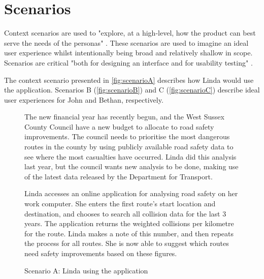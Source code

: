 \documentclass[authoryearcitations]{UoYCSproject}
\begin{document}
\section{Scenarios}

Context scenarios are used to "explore, at a high-level, how the product can best serve the needs of the personas" \citep{Cooper2007}. These scenarios are used to imagine an ideal user experience whilst intentionally being broad and relatively shallow in scope. Scenarios are critical "both for designing an interface and for usability testing" \citep{USDepartmentofHealthHumanServices}.

The context scenario presented in \autoref{fig:scenarioA} describes how Linda would use the application. Scenarios B (\autoref{fig:scenarioB}) and C (\autoref{fig:scenarioC}) describe ideal user experiences for John and Bethan, respectively.

\begin{figure}
	\begin{framed}
		The new financial year has recently begun, and the West Sussex County Council have a new budget to allocate to road safety improvements. The council needs to prioritise the most dangerous routes in the county by using publicly available road safety data to see where the most casualties have occurred. Linda did this analysis last year, but the council wants new analysis to be done, making use of the latest data released by the Department for Transport.
		
		Linda accesses an online application for analysing road safety on her work computer. She enters the first route's start location and destination, and chooses to search all collision data for the last 3 years. The application returns the weighted collisions per kilometre for the route. Linda makes a note of this number, and then repeats the process for all routes. She is now able to suggest which routes need safety improvements based on these figures.
  	\end{framed}
  \caption{Scenario A: Linda using the application}
  \label{fig:scenarioA}
\end{figure}
\end{document}
